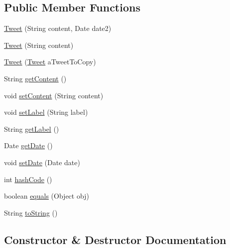 \subsection*{Public Member Functions}
\begin{DoxyCompactItemize}
\item 
\hyperlink{classbridges_1_1data__src__dependent_1_1_tweet_a615278c2672b2cb310d3c645566ad5cd}{Tweet} (String content, Date date2)
\item 
\hyperlink{classbridges_1_1data__src__dependent_1_1_tweet_a611e969f630c86098b204cfb4655f79b}{Tweet} (String content)
\item 
\hyperlink{classbridges_1_1data__src__dependent_1_1_tweet_a0b0ee5fa9a6221da95020bd5f78667d9}{Tweet} (\hyperlink{classbridges_1_1data__src__dependent_1_1_tweet}{Tweet} a\+Tweet\+To\+Copy)
\item 
String \hyperlink{classbridges_1_1data__src__dependent_1_1_tweet_a9b48f1ffc14fea21eb8a3e742601974a}{get\+Content} ()
\item 
void \hyperlink{classbridges_1_1data__src__dependent_1_1_tweet_a80ac618b5817392ce356657b2bf4145a}{set\+Content} (String content)
\item 
void \hyperlink{classbridges_1_1data__src__dependent_1_1_tweet_aa193633f4f61cc957f05a1c551f18822}{set\+Label} (String label)
\item 
String \hyperlink{classbridges_1_1data__src__dependent_1_1_tweet_a4b31431e42327efa953adde4c15cf168}{get\+Label} ()
\item 
Date \hyperlink{classbridges_1_1data__src__dependent_1_1_tweet_a801b0b5ea0127746c9c8ec0fc5e35ac2}{get\+Date} ()
\item 
void \hyperlink{classbridges_1_1data__src__dependent_1_1_tweet_a1a57c028bb87ad4e94af496a7260ffe9}{set\+Date} (Date date)
\item 
int \hyperlink{classbridges_1_1data__src__dependent_1_1_tweet_adf7dadcda59b68bb00b42480e4ad9956}{hash\+Code} ()
\item 
boolean \hyperlink{classbridges_1_1data__src__dependent_1_1_tweet_ae5edb76b9dd0f76b56eb40aa7c8cc077}{equals} (Object obj)
\item 
String \hyperlink{classbridges_1_1data__src__dependent_1_1_tweet_adfba67504a7463a7f16aff46d2bb893f}{to\+String} ()
\end{DoxyCompactItemize}


\subsection{Constructor \& Destructor Documentation}
\mbox{\label{classbridges_1_1data__src__dependent_1_1_tweet_a615278c2672b2cb310d3c645566ad5cd}} 
